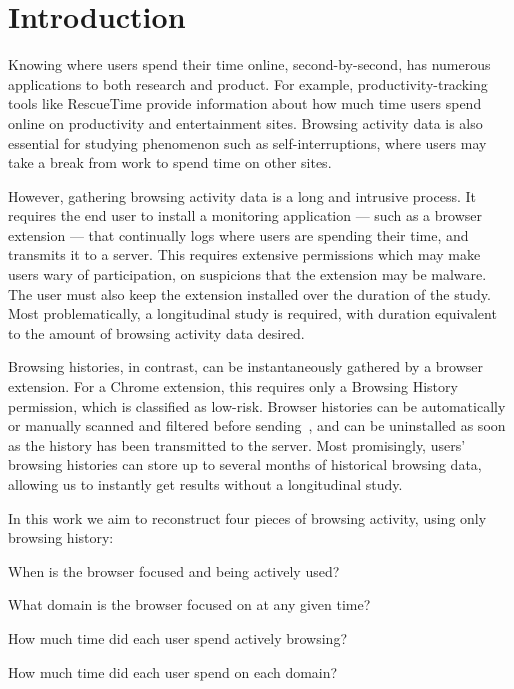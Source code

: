 \documentclass{sigchi}
\begin{document}


\section{Introduction}

Knowing where users spend their time online, second-by-second, has numerous applications to both research and product. For example, productivity-tracking tools like RescueTime provide information about how much time users spend online on productivity and entertainment sites. Browsing activity data is also essential for studying phenomenon such as self-interruptions, where users may take a break from work to spend time on other sites.

However, gathering browsing activity data is a long and intrusive process. It requires the end user to install a monitoring application --- such as a browser extension --- that continually logs where users are spending their time, and transmits it to a server. This requires extensive permissions which may make users wary of participation, on suspicions that the extension may be malware. The user must also keep the extension installed over the duration of the study. %
Most problematically, a longitudinal study is required, with duration equivalent to the amount of browsing activity data desired.

Browsing histories, in contrast, can be instantaneously gathered by a browser extension. For a Chrome extension, this requires only a Browsing History permission, which is classified as low-risk. Browser histories can be automatically or manually scanned and filtered before sending~\cite{eyebrowse}, and can be uninstalled as soon as the history has been transmitted to the server. Most promisingly, users' browsing histories can store up to several months of historical browsing data, allowing us to instantly get results without a longitudinal study.

In this work we aim to reconstruct four pieces of browsing activity, using only browsing history:

\begin{compactitem}
	\item When is the browser focused and being actively used?
	\item What domain is the browser focused on at any given time?
	\item How much time did each user spend actively browsing?
	\item How much time did each user spend on each domain?
\end{compactitem}
\end{document}
